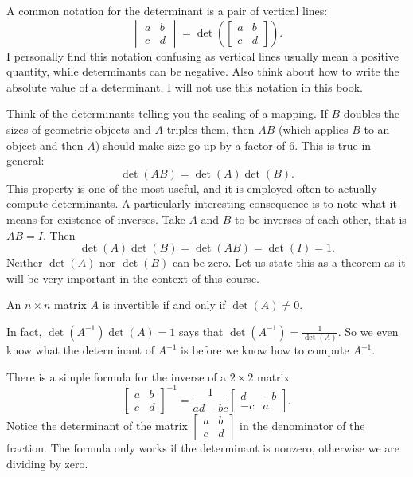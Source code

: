 A common notation for the determinant is a pair of vertical
lines:
\begin{equation*}
\begin{vmatrix}
a & b \\
c & d
\end{vmatrix}
=
\det \left(
\begin{bmatrix}
a & b \\
c & d
\end{bmatrix}
\right) .
\end{equation*}
I personally find this notation confusing as vertical lines usually
mean a positive quantity, while determinants can be negative.  Also
think about how to write the absolute value of a determinant.  I will not
use this notation in this book.

\medskip

Think of the determinants telling you the scaling of a mapping.  
If $B$ doubles the sizes of geometric objects and $A$ triples them,
then $AB$ (which applies $B$ to an object and then $A$) should make size
go up by a factor of $6$.  This is true in general:
\begin{equation*}
\det(AB) = \det(A)\det(B) .
\end{equation*}
This property is one of the most useful, and it is employed often to 
actually compute determinants.  A particularly interesting consequence is to
note what it means for existence of inverses.
Take $A$ and $B$ to be inverses of each other, that is $AB=I$.  Then
\begin{equation*}
\det(A)\det(B) = \det(AB) = \det(I) = 1 .
\end{equation*}
Neither $\det(A)$ nor $\det(B)$ can be zero.
Let us state this as a theorem
as it will be very important in the context of this course.

\begin{theorem}
An $n \times n$ matrix $A$ is invertible if and only if $\det (A) \not= 0$.
\end{theorem}

In fact, $\det(A^{-1}) \det(A) = 1$ says that $\det(A^{-1}) =
\frac{1}{\det(A)}$.  So we even know what the determinant of $A^{-1}$ is
before we know how to compute $A^{-1}$.

There is a simple formula for the inverse of a $2 \times 2$ matrix
\begin{equation*}
\begin{bmatrix}
a & b \\
c & d
\end{bmatrix}^{-1}
=
\frac{1}{ad-bc}
\begin{bmatrix}
d & -b \\
-c & a
\end{bmatrix} .
\end{equation*}
Notice the determinant of the matrix
$[\begin{smallmatrix}a&b\\c&d\end{smallmatrix}]$
in the denominator of the fraction.
The formula only works if the determinant is nonzero, otherwise we are
dividing by zero.

